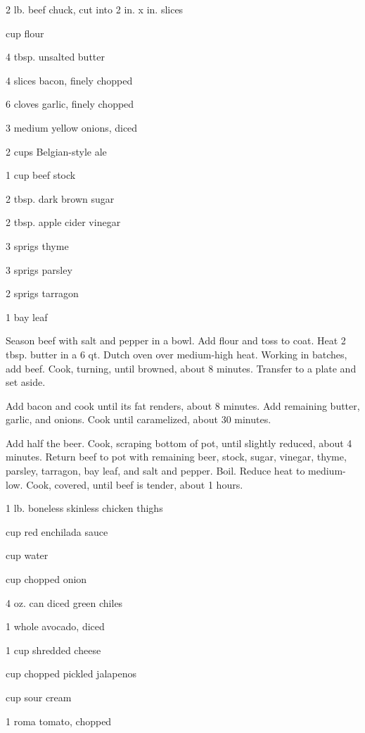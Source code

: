 \documentclass{cookbook}
\begin{document}

\begin{ingredients}
    \item 2 lb. beef chuck, cut into 2 in. x  in. slices
    \item {} cup flour
    \item 4 tbsp. unsalted butter
    \item 4 slices bacon, finely chopped
    \item 6 cloves garlic, finely chopped
    \item 3 medium yellow onions, diced
    \item 2 cups Belgian-style ale
    \item 1 cup beef stock
    \item 2 tbsp. dark brown sugar
    \item 2 tbsp. apple cider vinegar
    \item 3 sprigs thyme
    \item 3 sprigs parsley
    \item 2 sprigs tarragon
    \item 1 bay leaf
\end{ingredients}

Season beef with salt and pepper in a bowl. Add flour and toss to coat. Heat 2 tbsp. butter in a 6 qt. Dutch oven over medium-high heat. Working in batches, add beef. Cook, turning, until browned, about 8 minutes. Transfer to a plate and set aside.

Add bacon and cook until its fat renders, about 8 minutes. Add remaining butter, garlic, and onions. Cook until caramelized, about 30 minutes.

Add half the beer. Cook, scraping bottom of pot, until slightly reduced, about 4 minutes. Return beef to pot with remaining beer, stock, sugar, vinegar, thyme, parsley, tarragon, bay leaf, and salt and pepper. Boil. Reduce heat to medium-low. Cook, covered, until beef is tender, about 1  hours.




\begin{ingredients}
    \item 1 lb. boneless skinless chicken thighs
    \item {} cup red enchilada sauce
    \item {} cup water
    \item {} cup chopped onion
    \item 4 oz. can diced green chiles
    \item 1 whole avocado, diced
    \item 1 cup shredded cheese
    \item {} cup chopped pickled jalapenos
    \item {} cup sour cream
    \item 1 roma tomato, chopped
\end{ingredients}
\end{document}
